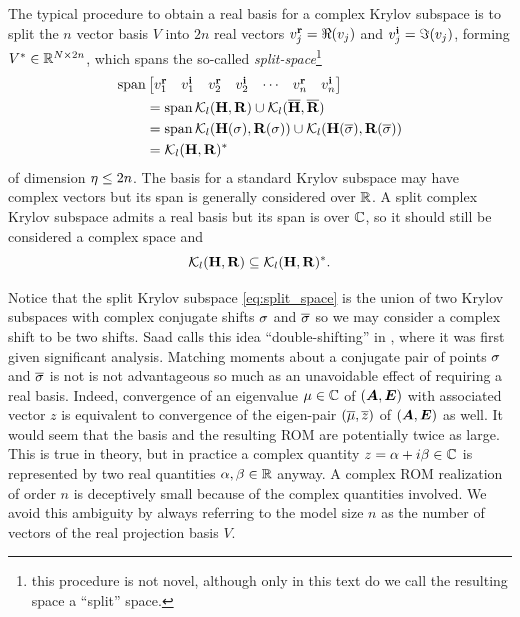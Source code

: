    The typical procedure to obtain a real basis for a complex Krylov subspace is to split the $n$ vector basis $V$ into $2n$ real vectors  $v^{\mathrm{\bf{r}}}_{j} = \Re(v_j)$ and $v^{\mathrm{\bf{i}}}_{j} = \Im(v_j)$, forming $V^*\in\mathbb{R}^{N\times 2n}$, which  spans the so-called  \emph{split-space}\footnote{this procedure is not novel, although only in this text do we call the resulting space a ``split'' space.}
\begin{equation}
\begin{aligned}
\operatorname*{span}&\begin{bmatrix} v^{\mathrm{\bf{r}}}_{1} & v^{\mathrm{\bf{i}}}_{1} & v^{\mathrm{\bf{r}}}_{2} & v^{\mathrm{\bf{i}}}_{2} & \cdots &  v^{\mathrm{\bf{r}}}_{n} & v^{\mathrm{\bf{i}}}_{n} \end{bmatrix}\\ 
&= \operatorname*{span} \mathcal{K}_{l}({\textbf{\textup{H}}},{\textbf{\textup{R}}}) \cup  \mathcal{K}_{l}({\overline{\textbf{\textup{H}}}},{\overline{\textbf{\textup{R}}}})\\
&= \operatorname*{span} \mathcal{K}_{l}({\textbf{\textup{H}}(\sigma)},{\textbf{\textup{R}}(\sigma)}) \cup  \mathcal{K}_{l}({\textbf{\textup{H}}(\overline{\sigma})},{\textbf{\textup{R}}(\overline{\sigma})})\\
&= \mathcal{K}_{l}({\textbf{\textup{H}}},{\textbf{\textup{R}}})^*
\end{aligned}
\label{eq:split_space}
\end{equation}
of dimension $\eta \leq 2n$.
   The basis for a standard Krylov subspace may have complex vectors but its span is generally considered over $\mathbb{R}$.  A split complex Krylov subspace admits a real basis but its span is over $\mathbb{C}$, so it should still be considered a complex space and
\begin{equation}
 \mathcal{K}_{l}({\textbf{\textup{H}}},{\textbf{\textup{R}}}) \subseteq  \mathcal{K}_{l}({\textbf{\textup{H}}},{\textbf{\textup{R}}})^*.
\label{eq:split_inclusion}
\end{equation}

Notice that the split Krylov subspace \eqref{eq:split_space} is the union of two Krylov subspaces with complex conjugate shifts $\sigma$ and $\overline{\sigma}$ so we may consider a complex shift to be two shifts.  Saad calls this idea ``double-shifting'' in \cite{complex_strategies}, where it was first given significant analysis.  Matching moments about a conjugate pair of points $\sigma$ and $\overline{\sigma}$ is not is not advantageous so much as an unavoidable effect of requiring a real basis.   Indeed, convergence of an eigenvalue $\mu\in\mathbb{C}$ of $(\bm{A},\bm{E})$ with associated vector $z$ is equivalent to convergence of the eigen-pair $(\overline{\mu},\overline{z})$ of $(\bm{A},\bm{E})$ as well.  It would seem that the basis and the resulting ROM are potentially twice as large.   This is true in theory, but in practice a complex quantity $z = \alpha + i\beta \in \mathbb{C}$ is represented by two real quantities $\alpha, \beta\in \mathbb{R}$ anyway.   A complex ROM realization of order $n$ is deceptively small because of the complex quantities involved.  We avoid this ambiguity by always referring to the model size $n$ as the number of vectors of the real projection basis $V$.


